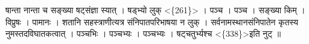 षान्ता नान्ता च सङ्ख्या षट्संज्ञा स्यात् । षड्भ्यो लुक्
\textless{}\{261\}\textgreater{} । पञ्च । पञ्च । सङ्ख्या किम् । विप्रुषः
। पामानः । शतानि सहस्त्राणीत्यत्र संनिपातपरिभाषया न लुक् ।
सर्वनामस्थानसंनिपातेन कृतस्य नुमस्तदविघातकत्वात् । पञ्चभिः । पञ्चभ्यः ।
पञ्चभ्यः । षट्चतुर्भ्यश्च \textless{}\{338\}\textgreater{}इति नुट् ॥
